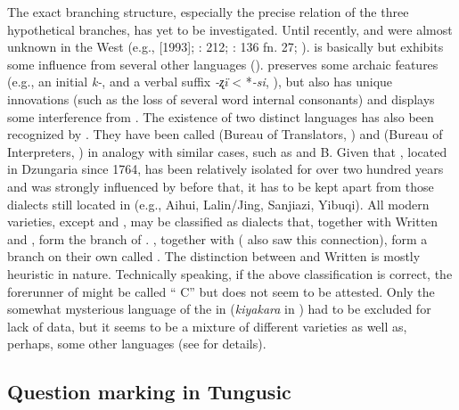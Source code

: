 The exact branching structure, especially the precise relation of the three hypothetical branches, has yet to be investigated. Until recently,  and  were almost unknown in the West (e.g., \citealt{MuYejun1985,MuYejun1986,MuYejun1987,Ikegami1999} [1993]; \citealt{Hölzl2014a}: 212; \citealt{Hölzl2015a}: 136 fn. 27; \citealt{Hölzl2017c,Hölzl2018b,Hölzl2018b}).  is basically  but exhibits some influence from several other  languages (\citealt{MuYejun1985,MuYejun1986}).  preserves some archaic features (e.g., an initial \textit{k-}, and a verbal suffix \textit{-ʐï} < *\textit{-si}, \citealt{Hölzl2017c,Hölzl2018b}), but also has unique innovations (such as the loss of several word internal consonants) and displays some interference from . The existence of two distinct  languages has also been recognized by \citet{Kiyose2000}. They have been called  (Bureau of Translators, \citealt{Kiyose1977}) and  (Bureau of Interpreters, \citealt{Kane1989}) in analogy with similar cases, such as  and B. Given that , located in Dzungaria since 1764, has been relatively isolated for over two hundred years and was strongly influenced by   before that, it has to be kept apart from those dialects still located in  (e.g., Aihui, Lalin/Jing, Sanjiazi, Yibuqi). All modern varieties, except  and , may be classified as  dialects that, together with Written  and , form the  branch of . , together with  (\citealt{MuYejun1987} also saw this connection), form a branch on their own called . The distinction between  and Written  is mostly heuristic in nature. Technically speaking, if the above classification is correct, the forerunner of  might be called “ C” but does not seem to be attested. Only the somewhat mysterious language of the  in  (\textit{kiyakara} in ) had to be excluded for lack of data, but it seems to be a mixture of different  varieties as well as, perhaps, some other  languages (see \citealt{Hölzl2018a} for details).


\subsection{Question marking in Tungusic}\label{sec:5.10.2}

